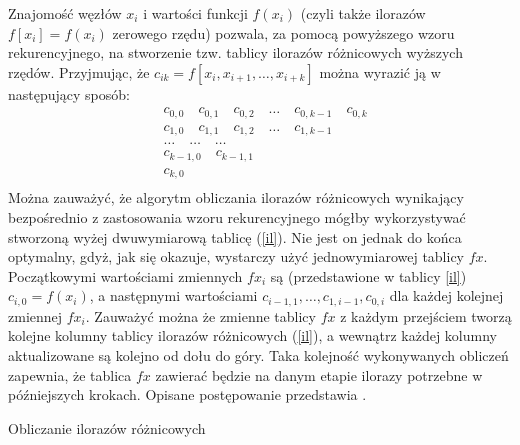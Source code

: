 \documentclass[11pt]{mk-polish-lab-report}
\begin{document}
Znajomość węzłów $x_i$ i wartości funkcji $f(x_i)$ (czyli także ilorazów $f[x_i] = f(x_i)$ zerowego rzędu) pozwala, za pomocą powyższego wzoru rekurencyjnego, na stworzenie tzw. tablicy ilorazów różnicowych wyższych rzędów. Przyjmując, że $c_{ik} = f[x_i,x_{i+1}, \ldots, x_{i+k}]$ można wyrazić ją w następujący sposób:
\begin{align}
&c_{0,0} \quad c_{0,1} \quad c_{0,2} \quad \ldots \quad c_{0,k-1} \quad c_{0,k} \nonumber \\
&c_{1,0} \quad c_{1,1} \quad c_{1,2} \quad \ldots \quad c_{1,k-1} \nonumber \\
&\ldots \quad \ldots \quad \ldots \nonumber \\
&c_{k-1,0} \quad c_{k-1,1} \nonumber \\
&c_{k,0} \nonumber \\
\label{il}
\end{align}
Można zauważyć, że algorytm obliczania ilorazów różnicowych wynikający bezpośrednio z zastosowania wzoru rekurencyjnego mógłby wykorzystywać stworzoną wyżej dwuwymiarową tablicę (\ref{il}). Nie jest on jednak do końca optymalny, gdyż, jak się okazuje, wystarczy użyć jednowymiarowej tablicy $fx$. Początkowymi wartościami zmiennych $fx_i$ są (przedstawione w tablicy \ref{il}) $c_{i,0} = f(x_i)$, a następnymi wartościami $c_{i-1,1}, \ldots, c_{1,i-1}, c_{0,i}$ dla każdej kolejnej zmiennej $fx_i$. Zauważyć można że zmienne tablicy $fx$ z każdym przejściem tworzą kolejne kolumny tablicy ilorazów różnicowych (\ref{il}), a wewnątrz każdej kolumny aktualizowane są kolejno od dołu do góry. Taka kolejność wykonywanych obliczeń zapewnia, że tablica $fx$ zawierać będzie na danym etapie ilorazy potrzebne w późniejszych krokach. Opisane postępowanie przedstawia . 

\begin{algorithm}[h]
				\DontPrintSemicolon
    			

\caption{Obliczanie ilorazów różnicowych}\label{alg:zad1}
\end{algorithm} 
\end{document}
